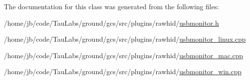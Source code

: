\-The documentation for this class was generated from the following files\-:\begin{DoxyCompactItemize}
\item 
/home/jb/code/\-Tau\-Labs/ground/gcs/src/plugins/rawhid/\hyperlink{usbmonitor_8h}{usbmonitor.\-h}\item 
/home/jb/code/\-Tau\-Labs/ground/gcs/src/plugins/rawhid/\hyperlink{usbmonitor__linux_8cpp}{usbmonitor\-\_\-linux.\-cpp}\item 
/home/jb/code/\-Tau\-Labs/ground/gcs/src/plugins/rawhid/\hyperlink{usbmonitor__mac_8cpp}{usbmonitor\-\_\-mac.\-cpp}\item 
/home/jb/code/\-Tau\-Labs/ground/gcs/src/plugins/rawhid/\hyperlink{usbmonitor__win_8cpp}{usbmonitor\-\_\-win.\-cpp}\end{DoxyCompactItemize}
